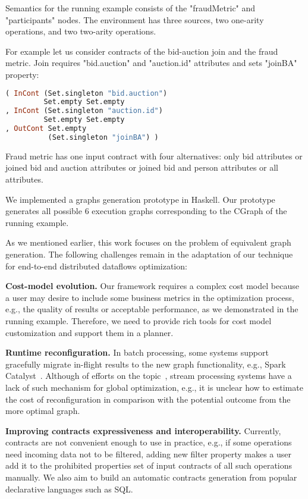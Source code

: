 Semantics for the running example consists of the "fraudMetric" and "participants" nodes.
The environment has three sources, two one-arity operations, and two two-arity operations.

For example let us consider contracts of the bid-auction join and the fraud metric.
Join requires "bid.auction" and "auction.id" attributes and sets "joinBA" property:
\begin{lstlisting}[language=Haskell]
( InCont (Set.singleton "bid.auction")
         Set.empty Set.empty
, InCont (Set.singleton "auction.id")
         Set.empty Set.empty
, OutCont Set.empty
          (Set.singleton "joinBA") )
\end{lstlisting}

Fraud metric has one input contract with four alternatives:
only bid attributes
or joined bid and auction attributes
or joined bid and person attributes
or all attributes.

We implemented a graphs generation prototype in Haskell.
Our prototype generates all possible 6 execution graphs corresponding to the CGraph of the running example.

As we mentioned earlier, this work focuses on the problem of equivalent graph generation. The following challenges remain in the adaptation of our technique for end-to-end distributed dataflows optimization:

\textbf{Cost-model evolution.}
Our framework requires a complex cost model because a user may desire to include some business metrics in the optimization process, e.g., the quality of results or acceptable performance, as we demonstrated in the running example. Therefore, we need to provide rich tools for cost model customization and support them in a planner.

\textbf{Runtime reconfiguration.}
In batch processing, some systems support gracefully migrate in-flight results to the new graph functionality, e.g., Spark Catalyst~\cite{armbrust2015spark}. Although of efforts on the topic~\cite{10.14778/3329772.3329777, grulich2020grizzly}, stream processing systems have a lack of such mechanism for global optimization, e.g., it is unclear how to estimate the cost of reconfiguration in comparison with the potential outcome from the more optimal graph.

\textbf{Improving contracts expressiveness and interoperability.}
Currently, contracts are not convenient enough to use in practice, e.g., if some operations need incoming data not to be filtered, adding new filter property makes a user add it to the prohibited properties set of input contracts of all such operations manually. We also aim to build an automatic contracts generation from popular declarative languages such as SQL.